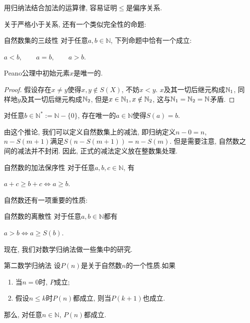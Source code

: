 用归纳法结合加法的运算律, 容易证明$\leq$是偏序关系. 

关于严格小于关系, 还有一个类似完全性的命题: 

\begin{proposition}{自然数集的三歧性}
	对于任意$a, b \in \mathbb{N}$, 下列命题中恰有一个成立: 
	\begin{center}
		$a<b,  \qquad a=b,  \qquad a>b.$
	\end{center}
\end{proposition}

\begin{proposition}{}
	Peano公理中初始元素$x$是唯一的. 
\end{proposition}
\begin{proof}
	假设存在$x \neq y$使得$x,y \notin S(X)$, 不妨$x<y$. $x$及其一切后继元构成$\mathbb{N} _1$, 同样地$y$及其一切后继元构成$\mathbb{N} _2$, 但是$x \in \mathbb{N}_1 ,x \notin \mathbb{N}_2$, 这与$\mathbb{N} _1 = \mathbb{N} _2 = \mathbb{N}$矛盾. 
\end{proof}

\begin{corollary}{} \label{cor:jmfaniyrcyzd}
	对任意$b \in \mathbb{N}^* := \mathbb{N} - \{ 0 \}$, 存在唯一的$a \in \mathbb{N}$使得$S(a)=b$.
\end{corollary}
\begin{remark}
	由这个推论, 我们可以定义自然数集上的减法, 即归纳定义$n-0=n$, $n-S(m+1)$满足$S(n-S(m+1))=n-S(m)$. 但是需要注意, 自然数之间的减法并不封闭. 因此, 正式的减法定义放在整数集处理. 
\end{remark}



\begin{proposition}{自然数的加法保序性}
	对于任意$a, b, c \in \mathbb{N}$, 有
	\begin{center}
		$a+c \geq b+c \Leftrightarrow a \geq b.$
	\end{center}
\end{proposition}

自然数还有一项重要的性质: 

\begin{proposition}{自然数的离散性}
	对于任意$a, b \in \mathbb{N}$都有
	\begin{center}
		$a>b \Leftrightarrow a \geq S(b).$
	\end{center}
\end{proposition}

现在, 我们对数学归纳法做一些集中的研究.

\begin{theorem}{第二数学归纳法} \label{thm:diergvna}
	设$P(n)$是关于自然数$n$的一个性质.如果
	\begin{enumerate}
		\item 当$n=0$时, $P$成立; 
		\item 假设$n \leq k$时$P(n)$都成立, 则当$P(k+1)$也成立.
	\end{enumerate}
	那么, 对任意$n \in \mathbb{N}$, $P(n)$都成立.
\end{theorem}

